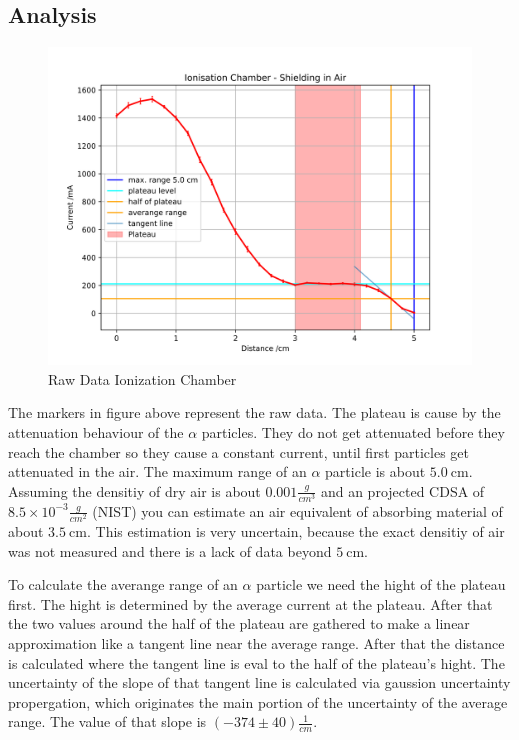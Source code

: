 \documentclass[12pt,twoside,a4paper]{scrartcl}
\begin{document}
	\subsection{Analysis}

		\begin{figure}[H]
			\centering
			\includegraphics[width = 0.8 \textwidth]{Plots/ionisation_chamber/CurrentToDistance.png}
			\caption{Raw Data Ionization Chamber}
		\end{figure}

    The markers in figure above represent the raw data. The plateau is cause by
    the attenuation behaviour of the $\alpha$ particles. They do not get attenuated
    before they reach the chamber so they cause a constant current, until first particles
    get attenuated in the air. The maximum range of an $\alpha$ particle is about
    $\SI{5.0}{\centi\metre}$. Assuming the densitiy of dry air is about $0.001\frac{g}{cm^3}$
    and an projected CDSA of $8.5\times10^{-3}\frac{g}{cm^2}$ (NIST) you can estimate an
    air equivalent of absorbing material of about $\SI{3.5}{\centi\meter}$. This
    estimation is very uncertain, because the exact densitiy of air was not measured and
    there is a lack of data beyond $\SI{5}{\centi\metre}$.

    To calculate the averange range of an $\alpha$ particle we need the hight of the plateau
    first. The hight is determined by the average current at the plateau. After that
    the two values around the half of the plateau are gathered to make a linear
    approximation like a tangent line near the average range. After that the distance
    is calculated where the tangent line is eval to the half of the plateau's hight.
    The uncertainty of the slope of that tangent line is calculated via gaussion
    uncertainty propergation, which originates the main portion of the uncertainty
    of the average range. The value of that slope is $(-374 \pm 40) \frac{1}{cm}$.
\end{document}
